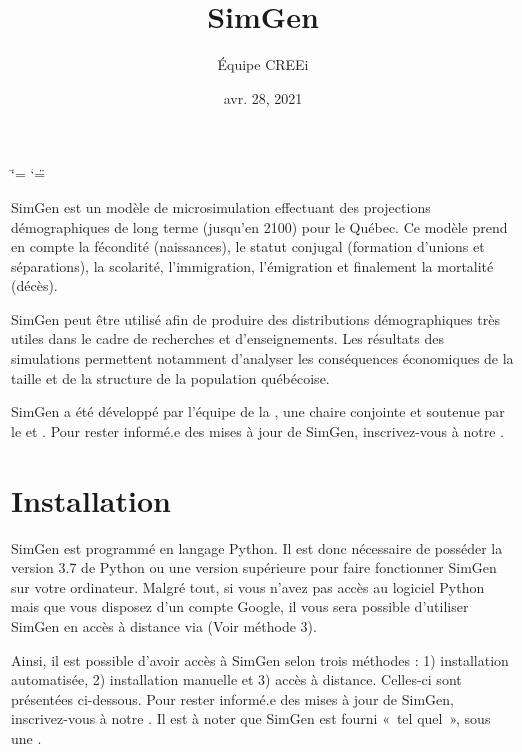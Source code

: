 \documentclass[letterpaper,10pt,french]{sphinxmanual}
\title{SimGen}
\date{avr. 28, 2021}
\author{Équipe CREEi}
\begin{document}
\ifdefined\shorthandoff
  \ifnum\catcode`\=\string=\active\shorthandoff{=}\fi
  \ifnum\catcode`\"=\active{}\fi
\fi

\pagestyle{empty}
\sphinxmaketitle
\pagestyle{plain}
\sphinxtableofcontents
\pagestyle{normal}
\label{\detokenize{index::doc}}


SimGen est un modèle de microsimulation effectuant des projections démographiques de long terme (jusqu’en 2100) pour le Québec.
Ce modèle prend en compte la fécondité (naissances), le statut conjugal (formation d’unions et séparations), la scolarité, l’immigration, l’émigration
et finalement la mortalité (décès).

SimGen peut être utilisé afin de produire des distributions démographiques très utiles dans le cadre de recherches et d’enseignements.
Les résultats des simulations permettent notamment d’analyser les conséquences économiques de la taille et de la structure de la population québécoise.

SimGen a été développé par l’équipe
de la ,
une chaire conjointe  et 
soutenue par le  et
.
Pour rester informé.e des mises à jour de SimGen, inscrivez-vous à notre .


\chapter{Installation}
\label{\detokenize{installation:installation}}\label{\detokenize{installation:premierpas}}\label{\detokenize{installation::doc}}\label{\detokenize{installation:installing-docdir}}
SimGen est programmé en langage Python. Il est donc nécessaire de posséder la version 3.7 de Python ou une version supérieure
pour faire fonctionner SimGen sur votre ordinateur.
Malgré tout, si vous n’avez pas accès au logiciel Python mais que vous disposez d’un compte Google, il vous
sera possible d’utiliser SimGen en accès à distance via  (Voir méthode 3).

Ainsi, il est possible d’avoir accès à SimGen selon trois méthodes : 1) installation automatisée, 2) installation manuelle et 3) accès à distance.
Celles-ci sont présentées ci-dessous.
Pour rester informé.e des mises à jour de SimGen, inscrivez-vous à notre .
Il est à noter que SimGen est fourni « tel quel », sous une .
\end{document}
